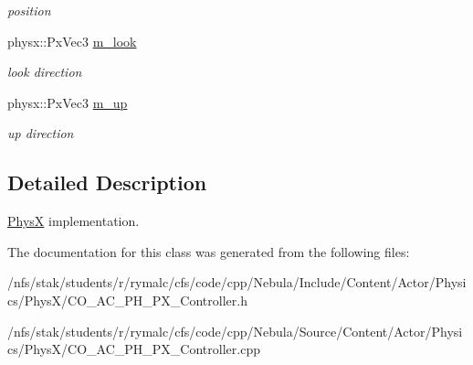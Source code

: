 \begin{DoxyCompactItemize}
\begin{DoxyCompactList}\small\item\em position \item\end{DoxyCompactList}\item 
\hypertarget{classContent_1_1Actor_1_1Physics_1_1PhysX_1_1Controller_ad1658db2bec6c01458faf78e428a1d4e}{
physx::PxVec3 \hyperlink{classContent_1_1Actor_1_1Physics_1_1PhysX_1_1Controller_ad1658db2bec6c01458faf78e428a1d4e}{m\_\-look}}
\label{classContent_1_1Actor_1_1Physics_1_1PhysX_1_1Controller_ad1658db2bec6c01458faf78e428a1d4e}

\begin{DoxyCompactList}\small\item\em look direction \item\end{DoxyCompactList}\item 
\hypertarget{classContent_1_1Actor_1_1Physics_1_1PhysX_1_1Controller_a95ceed4d264a5546fdd24fd080217939}{
physx::PxVec3 \hyperlink{classContent_1_1Actor_1_1Physics_1_1PhysX_1_1Controller_a95ceed4d264a5546fdd24fd080217939}{m\_\-up}}
\label{classContent_1_1Actor_1_1Physics_1_1PhysX_1_1Controller_a95ceed4d264a5546fdd24fd080217939}

\begin{DoxyCompactList}\small\item\em up direction \item\end{DoxyCompactList}\end{DoxyCompactItemize}


\subsection{Detailed Description}
\hyperlink{namespaceContent_1_1Actor_1_1Physics_1_1PhysX}{PhysX} implementation. 

The documentation for this class was generated from the following files:\begin{DoxyCompactItemize}
\item 
/nfs/stak/students/r/rymalc/cfs/code/cpp/Nebula/Include/Content/Actor/Physics/PhysX/CO\_\-AC\_\-PH\_\-PX\_\-Controller.h\item 
/nfs/stak/students/r/rymalc/cfs/code/cpp/Nebula/Source/Content/Actor/Physics/PhysX/CO\_\-AC\_\-PH\_\-PX\_\-Controller.cpp\end{DoxyCompactItemize}
